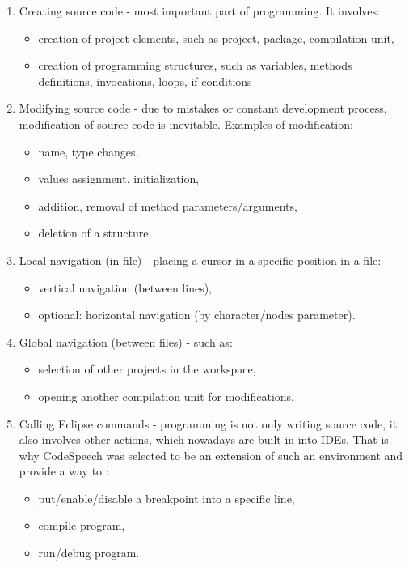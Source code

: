 \begin{enumerate}
  \item Creating source code - most important part of programming. It involves: \eg
    \begin{itemize}
     \item creation of project elements, such as project, package, compilation unit,
     \item creation of programming structures, such as variables, methods definitions, invocations, loops, if conditions \etc
   \end{itemize}
  \item Modifying source code - due to mistakes or constant development process, modification of source code is inevitable. Examples of modification: 
    \begin{itemize}
     \item name, type changes,
     \item values assignment, initialization,
     \item addition, removal of method parameters/arguments,
     \item deletion of a structure.
   \end{itemize}
   
  \item Local navigation (in file) - placing a cursor in a specific position in a file:
  \begin{itemize}
     \item vertical navigation (between lines),
     \item optional: horizontal navigation (by character/nodes \eg parameter).
   \end{itemize}
   
  \item Global navigation (between files) - such as:
  \begin{itemize}
     \item selection of other projects in the workspace,
     \item opening another compilation unit for modifications.
   \end{itemize}
   
  \item Calling Eclipse commands - programming is not only writing source code, it also involves other actions, which nowadays are built-in into IDEs. That is why CodeSpeech was selected to be an extension of such an environment and provide a way to \eg:
    \begin{itemize}
     \item put/enable/disable a breakpoint into a specific line,
     \item compile program,
     \item run/debug program.
   \end{itemize}
\end{enumerate}

